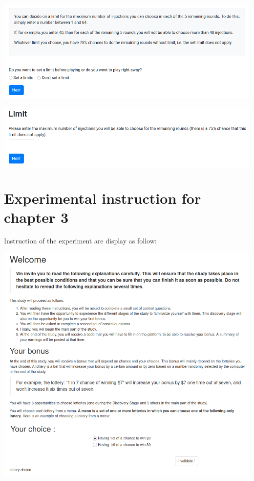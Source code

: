 \documentclass[
]{book}
\begin{document}
\includegraphics[width=0.9\linewidth]{annexe_file/temptation_instructions}

\includegraphics[width=0.9\linewidth]{annexe_file/temptation_decision}

\hypertarget{expe-instruc3}{%
\chapter{Experimental instruction for chapter 3}\label{expe-instruc3}}

Instruction of the experiment are display as follow:

\includegraphics[width=0.9\linewidth]{annexe_file/consigne_c3_1}
\end{document}
